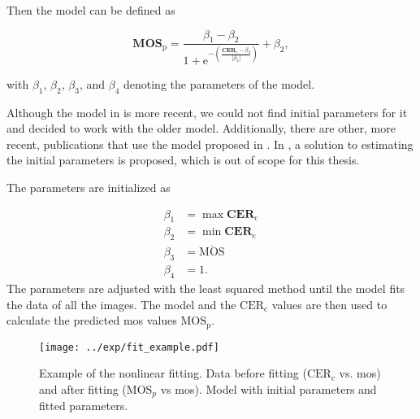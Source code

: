 Then the model can be defined as

\begin{equation}
    \mathbf{MOS}_{\text{p}} = \frac{\beta_{1}-\beta_{2}}{1 + \text{e}^{-\left(\frac{\mathbf{CER}_{\text{c}}-\beta_{3}}{|\beta_{4}|}\right)}} + \beta_{2},
    \label{eq:nonlinear}
\end{equation}


with $\beta_{1}$, $\beta_{2}$, $\beta_{3}$, and $\beta_{4}$ denoting the parameters of the model.

Although the model in \cite{nonlin_fit_original_2003} is more recent, we could not find initial parameters for it and decided to work with the older model.
Additionally, there are other, more recent, publications \cite{ni_esim_2017, nonlin_fit_appl_2017, nonlin_fit_appl_2018, nonlin_fit_appl_2014, nonlin_fit_appl_2011, nonlin_fit_appl_2015, doc_quality_survey_2023, iqa_database_2023, nonlin_fit_appl_2016} that use the model proposed in \cite{nonlin_fit_new_model_2006}.
In \cite{nonlin_fit_init_proof_2017}, a solution to estimating the initial parameters is proposed, which is out of scope for this thesis.


The parameters are initialized as
 
\begin{equation}
    \begin{aligned}
        \beta_{1} &= \max{\mathbf{CER}_{\text{c}}} \\
        \beta_{2} &= \min{\mathbf{CER}_{\text{c}}} \\
        \beta_{3} &= \overline{\text{MOS}} \\
        \beta_{4} &= 1.
    \end{aligned}
    \label{eq:nonlinear_init}
\end{equation}
The parameters are adjusted with the least squared method until the model fits the data of all the images.
The model and the $\text{CER}_{\text{c}}$ values are then used to calculate the predicted \gls{mos} values $\text{MOS}_{\text{p}}$.

\begin{figure}[h]
    \centering
    \texttt{[image: ../exp/fit\_example.pdf]}
    \caption{Example of the nonlinear fitting. Data before fitting ($\text{CER}_{c}$ vs. \gls{mos}) and after fitting ($\text{MOS}_{p}$ vs \gls{mos}). Model with initial parameters and fitted parameters.}
    \label{fig:nonlinear_fit}
\end{figure}


